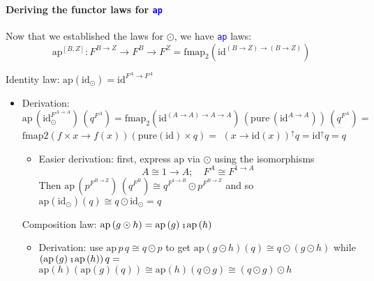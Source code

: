 \paragraph{Deriving the functor laws for \texttt{\textcolor{blue}{\footnotesize{}ap}} }

\vspace{-0.10cm}Now that we established the laws for $\odot$, we
have \texttt{\textcolor{blue}{\footnotesize{}ap}} laws:
\[
\text{ap}^{[B,Z]}:F^{B\rightarrow Z}\rightarrow F^{B}\rightarrow F^{Z}=\text{fmap}_{2}\left(\text{id}^{\left(B\rightarrow Z\right)\rightarrow\left(B\rightarrow Z\right)}\right)
\]

Identity law: $\text{ap}\left(\text{id}_{\odot}\right)=\text{id}^{F^{A}\rightarrow F^{A}}$
\begin{itemize}
\item Derivation:{\footnotesize{} $\text{ap}\,(\text{id}_{\odot}^{F^{A\rightarrow A}})\,(q^{F^{A}})=\text{fmap}_{2}(\text{id}^{\left(A\rightarrow A\right)\rightarrow A\rightarrow A})\,(\text{pure}\,(\text{id}^{A\rightarrow A}))\,(q^{F^{A}})=$}
{\footnotesize{}$\text{fmap2}\left(f\times x\rightarrow f(x)\right)\left(\text{pure}\left(\text{id}\right)\times q\right)=$
$\left(x\rightarrow\text{id}(x)\right)^{\uparrow}q=\text{id}^{\uparrow}q=q$} 
\begin{itemize}
\item Easier derivation: first, express {\footnotesize{}$\text{ap}$} via
$\odot$ using the isomorphisms{\footnotesize{}
\[
A\cong1\rightarrow A;\quad F^{A}\cong F^{1\rightarrow A}
\]
}Then {\footnotesize{}$\text{ap}\,(p^{F^{B\rightarrow Z}})\,(q^{F^{B}})\cong q^{F^{1\rightarrow B}}\odot p^{F^{B\rightarrow Z}}$}
and so {\footnotesize{}$\text{ap}\left(\text{id}_{\odot}\right)\left(q\right)\cong q\odot\text{id}_{\odot}=q$}{\footnotesize\par}
\end{itemize}
Composition law: $\text{ap}\left(g\odot h\right)=\text{ap}\left(g\right)\bef\text{ap}\left(h\right)$
\begin{itemize}
\item Derivation: use $\text{ap}\,p\,q\cong q\odot p$ to get {\footnotesize{}$\text{ap}\left(g\odot h\right)\left(q\right)\cong q\odot\left(g\odot h\right)$}
while {\footnotesize{}$\left(\text{ap}\left(g\right)\bef\text{ap}\left(h\right)\right)q=$
$\text{ap}\left(h\right)\left(\text{ap}\left(g\right)\left(q\right)\right)\cong\text{ap}\left(h\right)\left(q\odot g\right)\cong\left(q\odot g\right)\odot h$}{\footnotesize\par}
\end{itemize}
\end{itemize}


